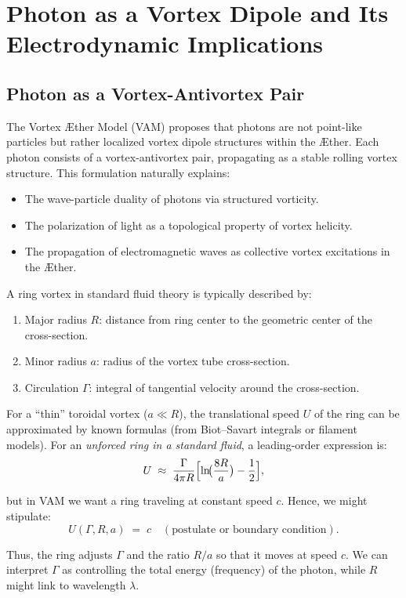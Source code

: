 
\section{Photon as a Vortex Dipole and Its Electrodynamic Implications}

\subsection{Photon as a Vortex-Antivortex Pair}
The Vortex Æther Model (VAM) proposes that photons are not point-like particles but rather localized vortex dipole structures within the Æther. Each photon consists of a vortex-antivortex pair, propagating as a stable rolling vortex structure. This formulation naturally explains:
\begin{itemize}
    \item The wave-particle duality of photons via structured vorticity.
    \item The polarization of light as a topological property of vortex helicity.
    \item The propagation of electromagnetic waves as collective vortex excitations in the Æther.
\end{itemize}

A ring vortex in standard fluid theory is typically described by:
\begin{enumerate}
    \item Major radius $R$: distance from ring center to the geometric center of the cross-section.
    \item Minor radius $a$: radius of the vortex tube cross-section.
    \item Circulation $\Gamma$: integral of tangential velocity around the cross-section.
\end{enumerate}

For a “thin” toroidal vortex ($ a \ll R$), the translational speed $U$ of the ring can be approximated by known formulas (from Biot–Savart integrals or filament models). For an \textit{unforced ring in a standard fluid}, a leading-order expression is:
$$ U
\;\approx\;
\frac{\Gamma}{4\pi R}
\Bigl[\ln\!\bigl(\frac{8R}{a}\bigr) - \frac{1}{2}\Bigr], $$

but in VAM we want a ring traveling at constant speed $c$. Hence, we might stipulate:
$$ U(\Gamma, R, a)
\;=\;
c
\quad
(\text{postulate or boundary condition}). $$

Thus, the ring adjusts $\Gamma$ and the ratio $R/a$ so that it moves at speed $c$. We can interpret $\Gamma$ as controlling the total energy (frequency) of the photon, while $R$ might link to wavelength $\lambda$.

